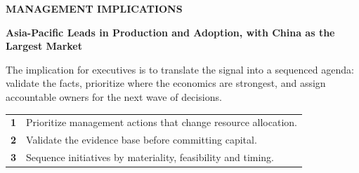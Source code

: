 \documentclass[10pt,a4paper]{article}
\begin{document}
\vspace{6pt}{\textcolor{BOBlue}{\scriptsize\bfseries STRATEGIC POSITIONING MAP}}\par
\begin{center}
\end{center}

\clearpage
{\textcolor{BOBlue}{\scriptsize\bfseries MANAGEMENT IMPLICATIONS}}\par\vspace{-1pt}
{\Large\sffamily\bfseries\color{BONavy} Asia-Pacific Leads in Production and Adoption, with China as the Largest Market}\par\vspace{4pt}
{\small The implication for executives is to translate the signal into a sequenced agenda: validate the facts, prioritize where the economics are strongest, and assign accountable owners for the next wave of decisions.}\par
\begin{tabularx}{\linewidth}{p{10mm}Y}
\textcolor{BOBlue}{\bfseries 1} & Prioritize management actions that change resource allocation. \\[5pt]
\textcolor{BOBlue}{\bfseries 2} & Validate the evidence base before committing capital. \\[5pt]
\textcolor{BOBlue}{\bfseries 3} & Sequence initiatives by materiality, feasibility and timing. \\[5pt]
\end{tabularx}
\vspace{6pt}
\end{document}
